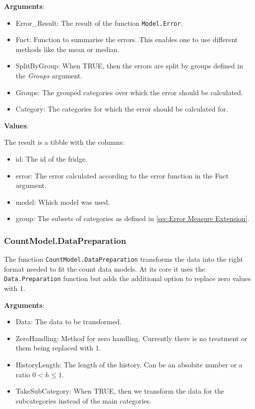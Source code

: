 \textbf{Arguments}:

\begin{itemize}
	\item Error\_Result: The result of the function \texttt{Model.Error}.
	\item Fnct: Function to summarise the errors. This enables one to use different methods like the mean or median. 
	\item SplitByGroup: When TRUE, then the errors are split by groups defined in the \textit{Groups} argument. 
	\item Groups: The grouped categories over which the error should be calculated. 
	\item Category: The categories for which the error should be calculated for.
\end{itemize}

\textbf{Values}:

The result is a tibble with the columns:
\begin{itemize}
	\item id: The id of the fridge. 
	\item error: The error calculated according to the error function in the Fnct argument. 
	\item model: Which model was used. 
	\item group: The subsets of categories as defined in \ref{sec:Error Measure Extension}.
\end{itemize}


\subsubsection{CountModel.DataPreparation}
\label{sec:CountModel.DataPreparation}

The function \texttt{CountModel.DataPreparation} transforms the data into the right format needed to fit the count data models. At its core it uses the \texttt{Data.Preparation} function but adds the additional option to replace zero values with 1. 

\textbf{Arguments}:

\begin{itemize}
	\item Data: The data to be transformed.
	\item ZeroHandling: Method for zero handling. Currently there is no treatment or them being replaced with 1. 
	\item HistoryLength: The length of the history. Can be an absolute number or a ratio $0<h\leq 1$. 
	\item TakeSubCategory: When TRUE, then we transform the data for the subcategories instead of the main categories. 
\end{itemize}

